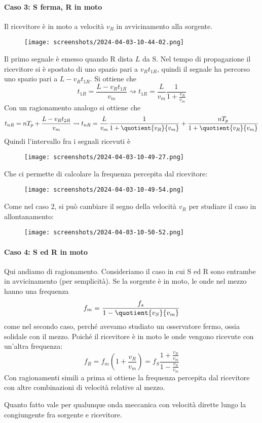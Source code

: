 \paragraph{Caso 3: S ferma, R in moto} Il ricevitore è in moto a velocità \(v_R\) in avvicinamento alla sorgente.
\begin{figure}[H]
	\centering
	\texttt{[image: screenshots/2024-04-03-10-44-02.png]}
\end{figure}
Il primo segnale è emesso quando R dista \(L\) da S. Nel tempo di propagazione il ricevitore si è spostato di uno spazio pari a \(v_R t_{1R} \), quindi il segnale ha percorso uno spazio pari a \(L- v_R t_{1R} \). Si ottiene che
\[
	t_{1R} = \frac{L- v_R t_{1R} }{v_m} \rightsquigarrow t_{1R} = \frac{L}{v_m} \frac{1}{1+ \frac{v_R}{v_m}}
\]
Con un ragionamento analogo si ottiene che 
\[
	t_{nR}  = n T_p + \frac{L-v_R t_{2R} }{v_m} \rightsquigarrow t_{nR} = \frac{L}{v_m} \frac{1}{1 + \quotient{v_R}{v_m}} + \frac{n T_p}{1+ \quotient{v_R}{v_m} }
\]
Quindi l'intervallo fra i segnali ricevuti è
\begin{figure}[H]
	\centering
	\texttt{[image: screenshots/2024-04-03-10-49-27.png]}
\end{figure}
Che ci permette di calcolare la frequenza percepita dal ricevitore:
\begin{figure}[H]
	\centering
	\texttt{[image: screenshots/2024-04-03-10-49-54.png]}
\end{figure}
Come nel caso 2, si può cambiare il segno della velocità \(v_R\) per studiare il caso in allontanamento:
\begin{figure}[H]
	\centering
	\texttt{[image: screenshots/2024-04-03-10-50-52.png]}
\end{figure}

\paragraph{Caso 4: S ed R in moto} Qui andiamo di ragionamento. Consideriamo il caso in cui S ed R sono entrambe in avvicinamento (per semplicità). Se la sorgente è in moto, le onde nel mezzo hanno una frequenza 
\[
	f_m = \frac{f_s}{1 - \quotient{v_S}{v_m} }
\]
come nel secondo caso, perché avevamo studiato un osservatore fermo, ossia solidale con il mezzo. Poiché il ricevitore è in moto le onde vengono ricevute con un'altra frequenza:
\[
	f_R = f_m \left( 1+ \frac{v_R}{v_m} \right) = f_S \frac{1+ \frac{v_R}{v_m}}{1- \frac{v_S}{v_m}}
\]
Con ragionamenti simili a prima si ottiene la frequenza percepita dal ricevitore con altre combinazioni di velocità relative al mezzo.
\begin{note}
	Quanto fatto vale per qualunque onda meccanica con velocità dirette lungo la congiungente fra sorgente e ricevitore.
\end{note}
